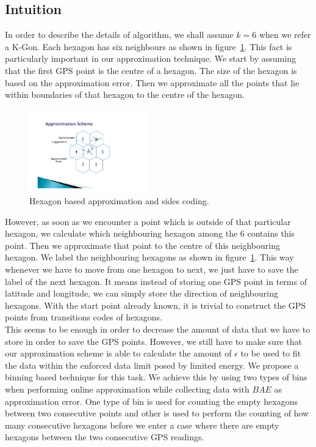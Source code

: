 \documentclass[conference]{IEEEtran}
\begin{document}
\subsection{Intuition}
\label{subs:Intution}
In order to describe the details of algorithm, we shall assume $k = 6$ when we refer a K-Gon. Each hexagon 
has six neighbours as shown in figure~\ref{fig:multiple-hexagons}. This fact is particularly important in 
our approximation technique. We start by assuming that the first GPS point is the centre of  a hexagon. The 
size of the hexagon is based on the approximation error. Then we approximate all the points that lie within 
boundaries of that hexagon to the centre of the hexagon. 
\begin{figure}[ht]
\centering
  \includegraphics[width=2in]{images/hexagon-figure.pdf}
  \caption {Hexagon based approximation and sides coding.}\label{fig:multiple-hexagons}
\end{figure}
However, as soon as we encounter a point which is outside of that particular hexagon, we calculate which 
neighbouring hexagon among the 6 contains this point. Then we approximate that point to the centre of this 
neighbouring hexagon. We label the neighbouring hexagons as shown in figure~\ref{fig:multiple-hexagons}. 
This way whenever we have to move from one hexagon to next, we just have to save the label of the next 
hexagon. It means instead of storing one GPS point in terms of latitude and longitude, we can simply store 
the direction of neighbouring hexagons. With the start point already known, it is trivial to construct the 
GPS points from transitions codes of hexagons.\\
This seems to be enough in order to decrease the amount of data that we have to store in order to save the 
GPS points. However, we still	have to make sure that our approximation scheme is able to calculate the amount 
of $\epsilon$ to be used to fit the data within the enforced data limit posed by limited energy. We propose a 
binning based technique for this task. We achieve this by using two types of bins when performing online 
approximation while collecting data with $BAE$ as approximation error. One type of bin is used for counting 
the empty hexagons between two consecutive points and other is used to perform the counting of how many 
consecutive hexagons before we enter a case where there are empty hexagons between the two consecutive 
GPS readings. 
\end{document}
